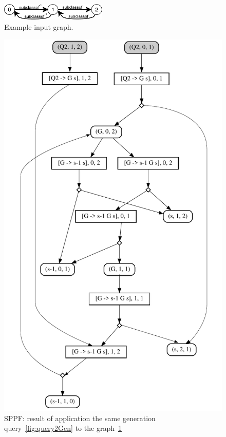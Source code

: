 \begin{figure}[h]
\includegraphics[width=0.45\textwidth]{graph}
\caption{Example input graph.}
\label{fig:graph}
\end{figure}

\begin{figure}[h]
\includegraphics[scale=0.5]{sppf}
\caption{SPPF: result of application the same generation query~\ref{fig:query2Gen} to the graph~\ref{fig:graph}}
\label{fig:sppf}
\end{figure}
